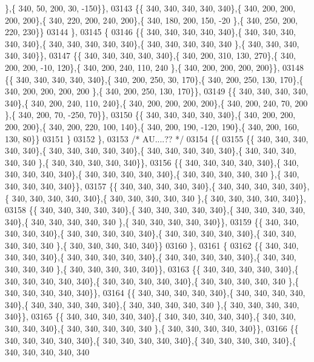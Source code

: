 \begin{DoxyCode}
      \},\{ 340,  50, 200,  30, -150\}\},
03143 \{\{ 340, 340, 340, 340, 340\},\{ 340, 200, 200, 200, 200\},\{ 340, 220, 200, 240, 200\},\{ 340, 180, 200, 150, -20
      \},\{ 340, 250, 200, 220, 230\}\}
03144 \},
03145 \{
03146 \{\{ 340, 340, 340, 340, 340\},\{ 340, 340, 340, 340, 340\},\{ 340, 340, 340, 340, 340\},\{ 340, 340, 340, 340, 340
      \},\{ 340, 340, 340, 340, 340\}\},
03147 \{\{ 340, 340, 340, 340, 340\},\{ 340, 200, 310, 130, 270\},\{ 340, 200, 200, -10, 120\},\{ 340, 200, 240, 110, 240
      \},\{ 340, 200, 200, 200, 200\}\},
03148 \{\{ 340, 340, 340, 340, 340\},\{ 340, 200, 250,  30, 170\},\{ 340, 200, 250, 130, 170\},\{ 340, 200, 200, 200, 200
      \},\{ 340, 200, 250, 130, 170\}\},
03149 \{\{ 340, 340, 340, 340, 340\},\{ 340, 200, 240, 110, 240\},\{ 340, 200, 200, 200, 200\},\{ 340, 200, 240,  70, 200
      \},\{ 340, 200,  70, -250,  70\}\},
03150 \{\{ 340, 340, 340, 340, 340\},\{ 340, 200, 200, 200, 200\},\{ 340, 200, 220, 100, 140\},\{ 340, 200, 190, -120, 
      190\},\{ 340, 200, 160, 130,  80\}\}
03151 \}
03152 \},
03153 \textcolor{comment}{/* AU....?? */}
03154 \{\{
03155 \{\{ 340, 340, 340, 340, 340\},\{ 340, 340, 340, 340, 340\},\{ 340, 340, 340, 340, 340\},\{ 340, 340, 340, 340, 340
      \},\{ 340, 340, 340, 340, 340\}\},
03156 \{\{ 340, 340, 340, 340, 340\},\{ 340, 340, 340, 340, 340\},\{ 340, 340, 340, 340, 340\},\{ 340, 340, 340, 340, 340
      \},\{ 340, 340, 340, 340, 340\}\},
03157 \{\{ 340, 340, 340, 340, 340\},\{ 340, 340, 340, 340, 340\},\{ 340, 340, 340, 340, 340\},\{ 340, 340, 340, 340, 340
      \},\{ 340, 340, 340, 340, 340\}\},
03158 \{\{ 340, 340, 340, 340, 340\},\{ 340, 340, 340, 340, 340\},\{ 340, 340, 340, 340, 340\},\{ 340, 340, 340, 340, 340
      \},\{ 340, 340, 340, 340, 340\}\},
03159 \{\{ 340, 340, 340, 340, 340\},\{ 340, 340, 340, 340, 340\},\{ 340, 340, 340, 340, 340\},\{ 340, 340, 340, 340, 340
      \},\{ 340, 340, 340, 340, 340\}\}
03160 \},
03161 \{
03162 \{\{ 340, 340, 340, 340, 340\},\{ 340, 340, 340, 340, 340\},\{ 340, 340, 340, 340, 340\},\{ 340, 340, 340, 340, 340
      \},\{ 340, 340, 340, 340, 340\}\},
03163 \{\{ 340, 340, 340, 340, 340\},\{ 340, 340, 340, 340, 340\},\{ 340, 340, 340, 340, 340\},\{ 340, 340, 340, 340, 340
      \},\{ 340, 340, 340, 340, 340\}\},
03164 \{\{ 340, 340, 340, 340, 340\},\{ 340, 340, 340, 340, 340\},\{ 340, 340, 340, 340, 340\},\{ 340, 340, 340, 340, 340
      \},\{ 340, 340, 340, 340, 340\}\},
03165 \{\{ 340, 340, 340, 340, 340\},\{ 340, 340, 340, 340, 340\},\{ 340, 340, 340, 340, 340\},\{ 340, 340, 340, 340, 340
      \},\{ 340, 340, 340, 340, 340\}\},
03166 \{\{ 340, 340, 340, 340, 340\},\{ 340, 340, 340, 340, 340\},\{ 340, 340, 340, 340, 340\},\{ 340, 340, 340, 340, 340

\end{DoxyCode}
